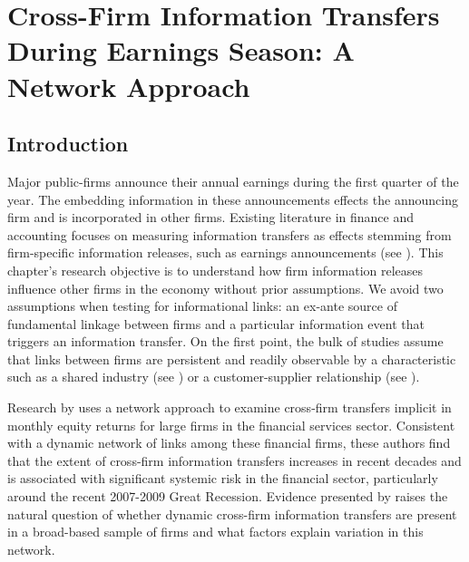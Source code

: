 \chapter{Cross-Firm Information Transfers During Earnings Season: A Network Approach} \label{Chapter:EATE}


\section{Introduction}


Major public-firms announce their annual earnings during the first quarter of the year.  The embedding information in these announcements effects the announcing firm and is incorporated in other firms.  Existing literature in finance and accounting focuses on measuring information transfers as effects stemming from firm-specific information releases, such as earnings announcements (see \cite{Foster1981}). This chapter's research objective is to understand how firm information releases influence other firms in the economy without prior assumptions.   We avoid two  assumptions when testing for informational links: an ex-ante source of fundamental linkage between firms and a particular information event that triggers an information transfer.  On the first point, the bulk of studies assume that links between firms are persistent and readily observable by a characteristic such as a shared industry (see \cite{Foster1981}) or a customer-supplier relationship (see \cite{OlsenDietrich1985,  AhernHarford2014}). 

Research by \cite{Billio2012} uses a network approach to examine cross-firm transfers implicit in monthly equity returns for large firms in the financial services sector.  Consistent with a dynamic network of links among these financial firms, these authors find that the extent of cross-firm information transfers increases in recent decades and is associated with significant systemic risk in the financial sector, particularly around the recent 2007-2009 Great Recession.  Evidence presented by \cite{Billio2012} raises the natural question of whether dynamic cross-firm information transfers are present in a broad-based sample of firms and what factors explain variation in this network.

